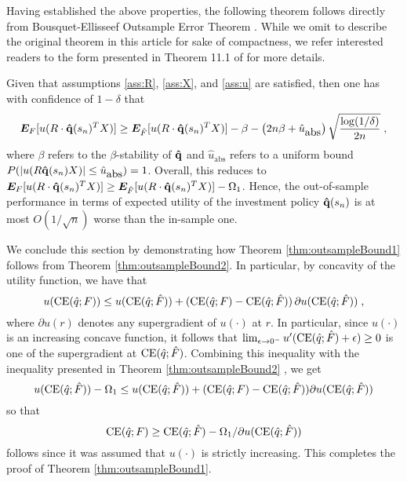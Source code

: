 Having established the above properties, the following theorem follows directly from
Bousquet-Ellisseef Outsample Error Theorem . While we omit to describe the original theorem in this article for sake of
compactness, we refer interested readers to the form presented in Theorem 11.1 of
\cite{mohri2012foundations} for more details.

\begin{thm}\label{thm:outsampleBound2}
  Given that assumptions \ref{ass:R}, \ref{ass:X}, and \ref{ass:u} are satisfied, then one
  has with confidence of $1-\delta$ that
  \[
    \bm E_{F}[u(R\cdot{\bold{{\hat{q}}}}(s_n)^TX)] \geq \bm E_{\hat{F}}[u(R\cdot{\bold{{\hat{q}}}}(s_n)^TX)] - \beta -
    \left(2n\beta+\hat{u}_{\mbox{abs}}\right)\sqrt{\frac{\log(1/\delta)}{2n}}\;,
  \]
  where $\beta$ refers to the $\beta$-stability of ${\bold{{\hat{q}}}}$ and $\hat{u}_{\mbox{abs}}$
  refers to a uniform bound $P(|u(R{\bold{{\hat{q}}}}(s_n)X)|\leq \hat{u}_{\mbox{abs}})=1$.
  Overall, this reduces to
  $\bm E_{F}[u(R\cdot{\bold{{\hat{q}}}}(s_n)^TX)] \geq \bm E_{\hat{F}}[u(R\cdot{\bold{{\hat{q}}}}(s_n)^TX)] - \Omega_1$. Hence,
  the out-of-sample performance in terms of expected utility of the investment policy
  ${\bold{{\hat{q}}}}(s_n)$ is at most $O(1/\sqrt{n})$ worse than the in-sample one.
\end{thm}

We conclude this section by demonstrating how Theorem \ref{thm:outsampleBound1} follows
from Theorem \ref{thm:outsampleBound2}. In particular, by concavity of the utility
function, we have that
\[
  u(\operatorname{CE}({\hat{q}};F))\leq u(\operatorname{CE}({\hat{q}};{\hat{F}}))+(\operatorname{CE}({\hat{q}};F)-\operatorname{CE}({\hat{q}};{\hat{F}}))\,\partial
  u(\operatorname{CE}({\hat{q}};{\hat{F}}))\;,
\] 
where $\partial u(r)$ denotes any supergradient of $u(\cdot)$ at $r$. In particular, since
$u(\cdot)$ is an increasing concave function, it follows that
$\lim_{\epsilon\to0^-}u'(\operatorname{CE}({\hat{q}};{\hat{F}})+\epsilon)\geq 0$ is one of the supergradient at
$\operatorname{CE}({\hat{q}};{\hat{F}})$. Combining this inequality with the inequality presented in Theorem
\ref{thm:outsampleBound2} , we
get
\[ 
  u(\operatorname{CE}({\hat{q}};{\hat{F}})) - \Omega_1 \leq
  u(\operatorname{CE}({\hat{q}};{\hat{F}}))+(\operatorname{CE}({\hat{q}};F)-\operatorname{CE}({\hat{q}};{\hat{F}}))\partial u(\operatorname{CE}({\hat{q}};{\hat{F}}))
\]
so that
\[
  \operatorname{CE}({\hat{q}};F) \geq \operatorname{CE}({\hat{q}};{\hat{F}}) - \Omega_1/\partial u(\operatorname{CE}({\hat{q}};{\hat{F}}))
\]
follows since it was assumed that $u(\cdot)$ is strictly increasing. This completes the
proof of Theorem \ref{thm:outsampleBound1}.


